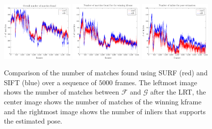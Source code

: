 \begin{figure}
  \centering
  \includegraphics[width=0.32\textwidth]{./figs/numMatches.pdf}
  \includegraphics[width=0.32\textwidth]{./figs/numMatchesWinning.pdf}
  \includegraphics[width=0.32\textwidth]{./figs/numInliers.pdf}
\caption{Comparison of the number of matches found using SURF (red) and SIFT (blue) over a sequence of $5000$ frames. The leftmost image shows the number of matches between $\mathcal{F}$ and $\mathcal{G}$ after the LRT, the center image shows the number of matches of the winning kframe and the rightmost image shows the number of inliers that supports the estimated pose.}
\label{fig:numMatches}
\end{figure}

